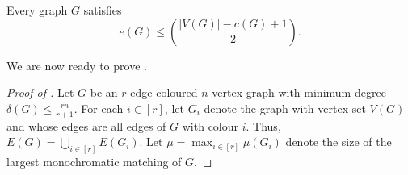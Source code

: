 \documentclass[10pt,a4paper,reqno]{amsart}
\begin{document}
\begin{lemma}
\label{lem:up_bound_edges_of_disconnected}
Every graph $G$ satisfies
\begin{equation*}
    e(G) \leq \binom{|V(G)| - c(G) + 1}{2}.
\end{equation*}
\end{lemma}

We are now ready to prove .
\begin{proof}[Proof of ]
Let $G$ be an $r$-edge-coloured $n$-vertex graph with minimum degree $\delta(G) \leq \frac{rn}{r + 1}$. For each $i \in [r]$, let $G_i$ denote the graph with vertex set $V(G)$ and whose edges are all edges of $G$ with colour $i$. Thus, $E(G) = \bigcup_{i \in [r]} E(G_i)$. Let $\mu = \max_{i \in [r]}\mu(G_i)$ denote the size of the largest monochromatic matching of $G$.


\end{proof}
\end{document}
